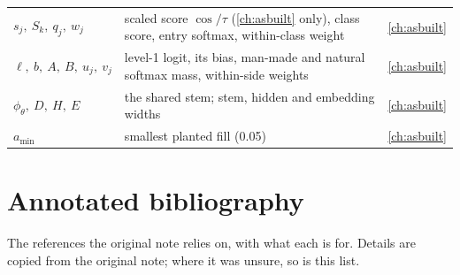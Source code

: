\documentclass[11pt,a4paper,oneside,openany]{book}
\begin{document}
{\begin{longtable}{@{}p{}p{}p{}@{}}
$s_j,\ S_k,\ q_j,\ w_j$ & scaled score $\cos/\tau$ (\cref{ch:asbuilt} only), class score, entry softmax, within-class weight & \cref{ch:asbuilt}\\
$\ell,\ b,\ A,\ B,\ u_j,\ v_j$ & level-1 logit, its bias, man-made and natural softmax mass, within-side weights & \cref{ch:asbuilt}\\
$\phi_\theta,\ D,\ H,\ E$ & the shared stem; stem, hidden and embedding widths & \cref{ch:asbuilt}\\
$a_{\min}$ & smallest planted fill (0.05) & \cref{ch:asbuilt}\\
\bottomrule
\end{longtable}}


\chapter{Annotated bibliography}
\label{ch:biblio}

The references the original note relies on, with what each is for. Details are copied from the original note; where it was unsure, so is this list.
\end{document}
